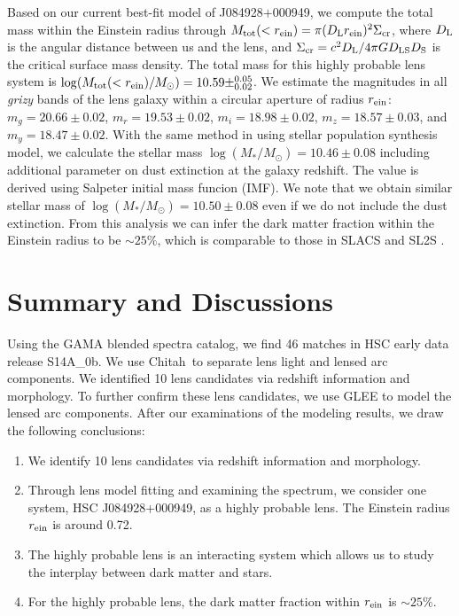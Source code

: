 \documentclass[apj]{emulateapj}
\def\rein{r_{\rm ein}}
\def\chitah{{\sc Chitah}}
\begin{document}
Based on our current best-fit model of J084928$+$000949, we compute the total mass within the Einstein radius through
$M_{\rm tot}(<\rein)= \pi (D_{\rm L}\rein)^2 \Sigma_{\rm cr}$,
where $D_{\rm L}$ is the angular distance between us and the lens, and $\Sigma_{\rm cr} = c^2 D_{\rm L}/4\pi G D_{\rm LS}D_{\rm S}$ is the critical surface mass density. 
The total mass for this highly probable lens system is $\log(M_{\rm tot}(<\rein)/M_\odot)=10.59\pm^{0.05}_{0.02}$.
We estimate the magnitudes in all {\it grizy} bands of the lens galaxy within a circular aperture of radius $\rein$:  
$m_g=20.66\pm0.02$, $m_r=19.53\pm0.02$, $m_i=18.98\pm0.02$, $m_z=18.57\pm0.03$, and $m_y=18.47\pm0.02$.  
With the same method in \cite{OguriEtal14} using \cite{Bruzual&Charlot03} stellar population synthesis model,
we calculate the stellar mass 
$\log(M_*/M_\odot)=10.46\pm0.08$
including additional parameter on dust extinction at the galaxy
redshift. The value is derived using Salpeter initial mass funcion
(IMF). We note that we obtain similar stellar mass of
$\log(M_*/M_\odot)=10.50\pm0.08$
even if we do not include the dust extinction. 
From this analysis we can infer the dark matter fraction within the Einstein radius to be $\sim 25\%$, which is comparable to those
in SLACS and SL2S 
\citep{BarnabeEtal11,AugerEtal10,SonnenfeldEtal15}. 



\section{Summary and Discussions}
\label{sec:summary}

Using the GAMA blended spectra catalog, we find 46 matches in HSC early data release S14A\_0b.
We use \chitah\ to separate lens light and lensed arc components. 
We identified 10 lens candidates via redshift information and morphology.
To further confirm these lens candidates, we use GLEE to model the lensed arc components.
After our examinations of the modeling results, we draw the following conclusions:

\begin{enumerate}
  \item  We identify 10 lens candidates via redshift information and morphology. 
  \item  Through lens model fitting and examining the spectrum, we consider one system, HSC J084928+000949, as a highly probable lens. The Einstein radius $\rein$ is around 0.72\arcsec.
  \item  The highly probable lens is an interacting system which allows us to study the interplay between dark matter and stars.
  \item  For the highly probable lens, the dark matter fraction within $\rein$ is $\sim 25\%$.
\end{enumerate}
\end{document}
